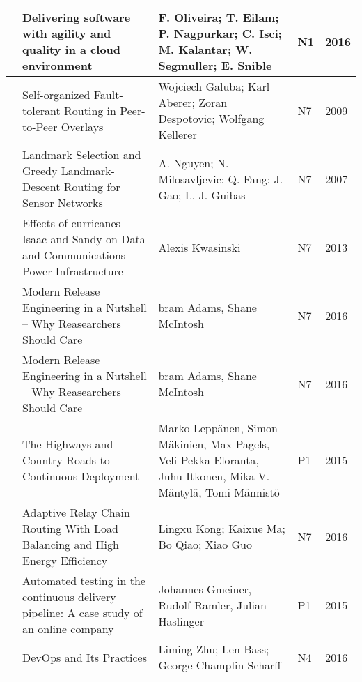 \begin{landscape}
\begin{longtable}{|l|L{10cm}|L{10cm}|l|l|}
      & Delivering software with agility and quality in a cloud environment & F. Oliveira; T. Eilam; P. Nagpurkar; C. Isci; M. Kalantar; W. Segmuller; E. Snible & N1 & 2016 \\ \hline
    
     & Self-organized Fault-tolerant Routing in Peer-to-Peer Overlays & Wojciech Galuba; Karl Aberer; Zoran Despotovic; Wolfgang Kellerer & N7 & 2009 \\ \hline
    
     & Landmark Selection and Greedy Landmark-Descent Routing for Sensor Networks & A. Nguyen; N. Milosavljevic; Q. Fang; J. Gao; L. J. Guibas & N7 & 2007 \\ \hline
    
     & Effects of curricanes Isaac and Sandy on Data and Communications Power Infrastructure & Alexis Kwasinski & N7 & 2013 \\ \hline
    
     & Modern Release Engineering in a Nutshell -- Why Reasearchers Should Care & bram Adams, Shane McIntosh & N7 & 2016\\ \hline
    
     & Modern Release Engineering in a Nutshell -- Why Reasearchers Should Care & bram Adams, Shane McIntosh & N7 & 2016\\ \hline
    
     & The Highways and Country Roads to Continuous Deployment & Marko Leppänen, Simon Mäkinien, Max Pagels, Veli-Pekka Eloranta, Juhu Itkonen, Mika V. Mäntylä, Tomi Männistö & P1 & 2015\\ \hline
    
     & Adaptive Relay Chain Routing With Load Balancing and High Energy Efficiency & Lingxu Kong; Kaixue Ma; Bo Qiao; Xiao Guo & N7 & 2016 \\ \hline
    
     & Automated testing in the continuous delivery pipeline: A case study of an online company & Johannes Gmeiner, Rudolf Ramler, Julian Haslinger & P1 & 2015\\ \hline
    
     & DevOps and Its Practices & Liming Zhu; Len Bass; George Champlin-Scharff & N4 & 2016 \\ \hline
    

\end{longtable}
\end{landscape}
